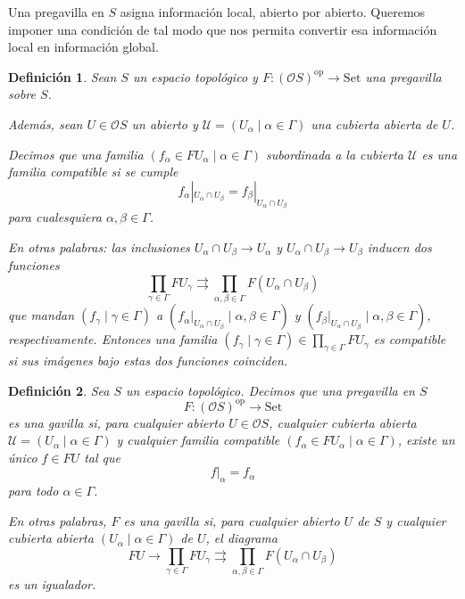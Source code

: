 \documentclass[12pt,letterpaper,titlepage]{article}
\newtheorem*{defn}{Definición}
\theoremstyle{definition}
\renewcommand\cal[1]{\mathcal{#1}}
\newcommand\<{\langle}
\renewcommand\>{\rangle}
\newcommand{\Con}{\mathrm{Set}}
\newcommand{\op}{\mathrm{op}}
\begin{document}
Una pregavilla en $S$ asigna información local, abierto por abierto.
Queremos imponer una condición de tal modo que nos permita
convertir esa información local en información global.

\begin{defn}
    Sean $S$ un espacio topológico y $F:(\cal OS)^\op\to\Con$
    una pregavilla sobre $S$.
    
    Además, sean $U\in\cal OS$ un abierto y
    $\cal U = (U_\alpha\mid\alpha\in \Gamma)$
    una cubierta abierta de $U$.
    
    Decimos que una familia
    $(f_\alpha\in FU_\alpha\mid\alpha\in\Gamma)$
    subordinada a la cubierta $\cal U$
    es una familia compatible si se cumple
    \[
        f_\alpha|_{U_\alpha\cap U_\beta}
        =
        f_\beta|_{U_\alpha\cap U_\beta}
    \]
    para cualesquiera $\alpha,\beta\in\Gamma$.
    
    En otras palabras: las inclusiones
    $U_\alpha\cap U_\beta\to U_\alpha$
    y $U_\alpha\cap U_\beta\to U_\beta$ inducen
    dos funciones
    \[
        \prod_{\gamma\in\Gamma}FU_\gamma
        \rightrightarrows
        \prod_{\alpha,\beta\in\Gamma}F(U_\alpha\cap U_\beta)
    \]
    que mandan $(f_\gamma\mid\gamma\in\Gamma)$
    a $(f_\alpha|_{U_\alpha\cap U_\beta}\mid\alpha,\beta\in\Gamma)$
    y $(f_\beta|_{U_\alpha\cap U_\beta}\mid\alpha,\beta\in\Gamma)$,
    respectivamente.
    Entonces una familia
    $(f_\gamma\mid\gamma\in\Gamma)\in\prod_{\gamma\in\Gamma}FU_\gamma$
    es compatible si sus imágenes bajo estas dos funciones coinciden.
\end{defn}

\begin{defn}
    Sea $S$ un espacio topológico.
    Decimos que una pregavilla en $S$
    \[
        F:(\cal OS)^\op\to\Con
    \]
    es una gavilla si,
    para cualquier abierto $U\in\cal OS$, cualquier cubierta abierta
    $\cal U=(U_\alpha\mid \alpha\in\Gamma)$
    y cualquier familia compatible
    $(f_\alpha\in FU_\alpha\mid \alpha\in\Gamma)$,
    existe un único $f\in FU$ tal que
    \[
        f|_\alpha = f_\alpha
    \]
    para todo $\alpha\in\Gamma$.
    
    En otras palabras, $F$ es una gavilla si,
    para cualquier abierto $U$ de $S$ y
    cualquier cubierta abierta
    $(U_\alpha\mid\alpha\in\Gamma)$ de $U$,
    el diagrama
    \[
        FU
        \to
        \prod_{\gamma\in\Gamma} FU_\gamma
        \rightrightarrows
        \prod_{\alpha,\beta\in\Gamma}F(U_\alpha\cap U_\beta)
    \]
    es un igualador.
\end{defn}
\end{document}
